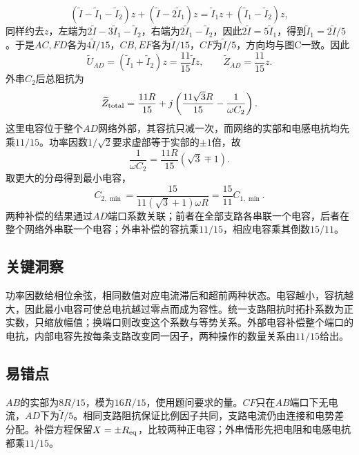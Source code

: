 \documentclass[UTF8,fontset=fandol,a4paper,11pt]{ctexart}
\begin{document}
\[
(\widetilde I-\widetilde I_1-\widetilde I_2)z
+(\widetilde I-2\widetilde I_1)z
=\widetilde I_1z+(\widetilde I_1-\widetilde I_2)z,
\]
同样约去$z$，左端为$2\widetilde I-3\widetilde I_1-\widetilde I_2$，右端为$2\widetilde I_1-\widetilde I_2$，因此$2\widetilde I=5\widetilde I_1$，得到$\widetilde I_1=2\widetilde I/5$。于是$AC,FD$各为$4\widetilde I/15$，$CB,EF$各为$\widetilde I/15$，$CF$为$\widetilde I/5$，方向均与图C一致。因此
\[
\widetilde U_{AD}=(\widetilde I_1+\widetilde I_2)z
=\frac{11}{15}\widetilde I z,\qquad
\boxed{\widetilde Z_{AD}=\frac{11}{15}z}.
\]
外串$C_2$后总阻抗为
\[
\widetilde Z_{\rm total}
=\frac{11R}{15}
+j\left(\frac{11\sqrt3R}{15}-\frac1{\omega C_2}\right).
\]
这里电容位于整个$AD$网络外部，其容抗只减一次，而网络的实部和电感电抗均先乘$11/15$。功率因数$1/\sqrt2$要求虚部等于实部的$\pm1$倍，故
\[
\frac1{\omega C_2}
=\frac{11R}{15}(\sqrt3\mp1).
\]
取更大的分母得到最小电容，
\[
\boxed{C_{2,\min}
=\frac{15}{11(\sqrt3+1)\omega R}
=\frac{15}{11}C_{1,\min}}.
\]
两种补偿的结果通过$AD$端口系数关联；前者在全部支路各串联一个电容，后者在整个网络外串联一个电容；外串补偿的容抗乘$11/15$，相应电容乘其倒数$15/11$。




\subsection*{关键洞察}

功率因数给相位余弦，相同数值对应电流滞后和超前两种状态。电容越小，容抗越大，因此最小电容可使总电抗越过零点而成为容性。统一支路阻抗时拓扑系数为正实数，只缩放幅值；换端口则改变这个系数与等势关系。外部电容补偿整个端口的电抗，内部电容先按每条支路改变同一因子，两种操作的数量关系由$11/15$给出。



\subsection*{易错点}

$AB$的实部为$8R/15$，模为$16R/15$，使用题问要求的量。$CF$只在$AB$端口下无电流，$AD$下为$\widetilde I/5$。相同支路阻抗保证比例因子共同，支路电流仍由连接和电势差分配。补偿方程保留$X=\pm R_{\rm eq}$，比较两种正电容；外串情形先把电阻和电感电抗都乘$11/15$。


\end{document}
